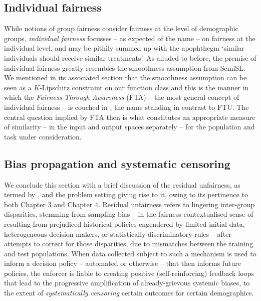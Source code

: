 \subsection{Individual fairness}\label{ssec:individual-fairness}
While notions of group fairness consider fairness at the level of demographic groups,
\emph{individual fairness} focusses -- as expected of the name -- on fairness at the individual
level, and may be pithily summed up with the apophthegm `similar individuals should receive similar
treatments'.
%
As alluded to before, the premise of individual fairness greatly resembles the smoothness
assumption from SemiSL. 
%
We mentioned in its associated section that the smoothness assumption can be seen as a
\(K\)-Lipschitz constraint on our function class and this is the manner in which the \emph{Fairness
Through Awareness} (FTA) -- the most general concept of individual fairness -- is couched in
\cite{dwork2012fairness}, the name standing in contrast to FTU.
%
The central question implied by FTA then is what constitutes an appropriate measure of similarity
-- in the input and output spaces separately -- for the population and task under consideration.

\subsection{Bias propagation and systematic censoring}\label{ssec:residual-unfairness}
We conclude this section with a brief discussion of the residual unfairness, as termed by
\cite{kallus2018residual}, and the problem setting giving rise to it, owing to its pertinence to
both Chapter 3 and Chapter 4.
%
Residual unfairness refers to lingering inter-group disparities, stemming from sampling bias -- in
the fairness-contextualised sense of resulting from prejudiced historical policies engendered by
limited initial data, heterogeneous decision-makers, or statistically discriminatory rules -- after
attempts to correct for those disparities, due to mismatches between the training and test
populations.
%
When data collected subject to such a mechanism is used to inform a decision policy -- automated or
otherwise -- that then informs future policies, the enforcer is liable to creating positive
(self-reinforcing) feedback loops that lead to the progressive amplification of already-grievous
systemic biases, to the extent of \emph{systematically censoring} certain outcomes for certain
demographics.

